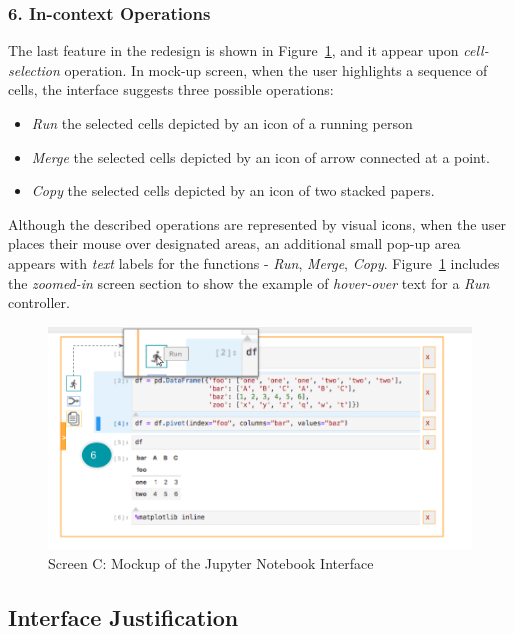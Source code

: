 \documentclass[12pt,letterpaper]{article}
\begin{document}
\subsubsection*{6. In-context Operations}
The last feature in the redesign is shown in Figure~\ref{fig::6}, and it appear upon \textit{cell-selection} operation. In mock-up screen, when the user highlights a sequence of cells, the interface suggests three possible operations:

\begin{itemize}
    \item \textit{Run} the selected cells depicted by an icon of a running person
    \item \textit{Merge} the selected cells depicted by an icon of arrow connected at a point.
    \item \textit{Copy} the selected cells depicted by an icon of two stacked papers.
\end{itemize}

Although the described operations are represented by visual icons, when the user places their mouse over designated areas, an additional small pop-up area appears with \textit{text} labels for the functions - \textit{Run}, \textit{Merge}, \textit{Copy}. Figure~\ref{fig::6} includes the \textit{zoomed-in} screen section to show the example of \textit{hover-over} text for a \textit{Run} controller.


\begin{figure}[h]
\centering
\includegraphics[scale=.45]{figures/project-principles/jupyter_mock_screen_c.png}
\caption{Screen C: Mockup of the Jupyter Notebook Interface}
\label{fig::6}
\end{figure}


\subsection*{Interface Justification}



 

\end{document}

